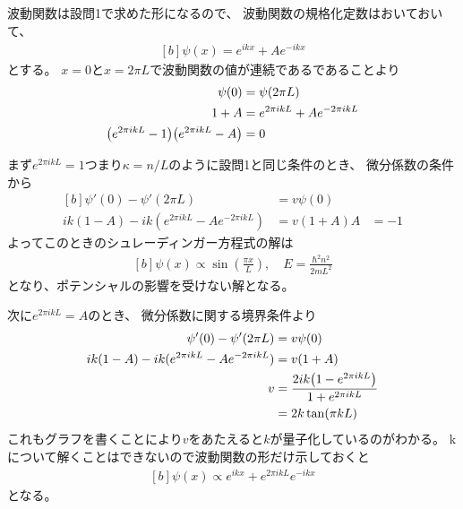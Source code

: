\documentclass[../../sp_2014.tex]{subfiles}
\begin{document}
\subsection{}
波動関数は設問1で求めた形になるので、
波動関数の規格化定数はおいておいて、
\begin{equation}\begin{aligned}[b]
    \psi(x)=e^{ikx}+Ae^{-ikx}
\end{aligned}\end{equation}
とする。
\(x=0\)と\(x=2\pi L\)で波動関数の値が連続であるであることより
\begin{equation}\begin{aligned}[b]
    \psi(0) &= \psi(2\pi L)\\
    1+A &= e^{2\pi ikL}+Ae^{-2\pi ikL}\\
    \qty(e^{2\pi ikL}-1)\qty(e^{2\pi ikL}-A) &= 0
\end{aligned}\end{equation}

まず\(e^{2\pi ikL}=1\)つまり\(\kappa =n/L\)のように設問1と同じ条件のとき、
微分係数の条件から
\begin{equation}\begin{aligned}[b]
    \psi'(0)-\psi'(2\pi L) &= v\psi(0)\\
    ik(1-A)-ik(e^{2\pi ikL}-Ae^{-2\pi ikL})&=v(1+A)
    A &= -1
\end{aligned}\end{equation}
よってこのときのシュレーディンガー方程式の解は
\begin{equation}\begin{aligned}[b]
    \psi(x) \propto \sin(\frac{\pi x}{L}), \quad E=\frac{\hbar^2n^2}{2mL^2}
\end{aligned}\end{equation}
となり、ポテンシャルの影響を受けない解となる。

次に\(e^{2\pi ikL}=A\)のとき、
微分係数に関する境界条件より
\begin{equation}\begin{aligned}[b]
    \psi'(0)-\psi'(2\pi L) &= v\psi(0)\\
    ik(1-A)-ik(e^{2\pi ikL}-Ae^{-2\pi ikL})&=v(1+A)\\
    v &= \frac{2ik\qty(1-e^{2\pi ikL})}{1+e^{2\pi ikL}}\\
    &= 2k\tan(\pi kL)
\end{aligned}\end{equation}
これもグラフを書くことにより\(v\)をあたえると\(k\)が量子化しているのがわかる。
k について解くことはできないので波動関数の形だけ示しておくと
\begin{equation}\begin{aligned}[b]
    \psi(x)\propto e^{ikx}+e^{2\pi ikL}e^{-ikx}
\end{aligned}\end{equation}
となる。
\end{document}
